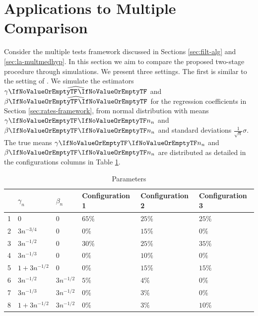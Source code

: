 \documentclass[ejs, twoside]{imsart}
\theoremstyle{plain}
\theoremstyle{remark}
\newcommand{\estim}[1]{\widehat{\regcoef{#1}}}
\numberwithin{equation}{section}
\numberwithin{table}{section}
\numberwithin{figure}{section}
\begin{document}

\section{Applications to Multiple Comparison} \label{appmc}


Consider the multiple tests framework discussed in Sections \ref{sec:filt-alg} and \ref{sec:la-multmedhyp}. In this section we aim to compare the proposed two-stage procedure through simulations. We present three settings. The first is similar to the setting of \citet{djordjilovic_optimal_2020}. We simulate the estimators \(\estim{1}\) and \(\estim{2}\) for the regression coefficients in Section \ref{sec:rates-framework}, from normal distribution with means \(\regcoef{1}[][n]\) and \(\regcoef{2}[][n]\) and standard deviations \(\frac{1}{\sqrt{n}} \sigma\).
The true means \(\regcoef{1}[][n]\) and \(\regcoef{2}[][n]\) are distributed as detailed in the configurations columns in Table \ref{tbl:param}.
\begin{table}[ht]
\centering
\begin{tabular}{rlllll}
  \hline
 & \(\gamma_n\) & \(\beta_n\) & Configuration 1 & Configuration 2 & Configuration 3 \\ 
  \hline
1 & \(0\) & \(0\) & \(65\%\) & \(25\%\) & \(25\%\) \\ 
  2 & \(3 n^{-3/4}\) & \(0\) & \(0\%\) & \(15\%\) & \(0\%\) \\ 
  3 & \(3 n^{-1/2}\) & \(0\) & \(30\%\) & \(25\%\) & \(35\%\) \\ 
  4 & \(3 n^{-1/3}\) & \(0\) & \(0\%\) & \(10\%\) & \(0\%\) \\ 
  5 & \(1 + 3 n^{-1/2}\) & \(0\) & \(0\%\) & \(15\%\) & \(15\%\) \\ 
  6 & \(3 n^{-1/2}\) & \(3 n^{-1/2}\) & \(5\%\) & \(4\%\) & \(0\%\) \\ 
  7 & \(3 n^{-1/3}\) & \(3 n^{-1/2}\) & \(0\%\) & \(3\%\) & \(0\%\) \\ 
  8 & \(1 + 3 n^{-1/2}\) & \(3 n^{-1/2}\) & \(0\%\) & \(3\%\) & \(10\%\) \\ 
   \hline
\end{tabular}
\caption{Parameters} 
\label{tbl:param}
\end{table}
\end{document}
